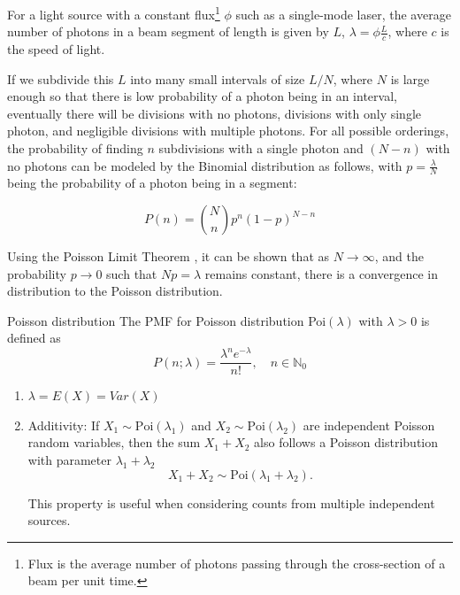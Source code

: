 For a light source with a constant flux\footnote{Flux is the average number of photons passing through the cross-section of a beam per unit time.} $\phi$ such as a single-mode laser, the average number of photons in a beam segment of length is given by $L$, $\lambda = \phi \frac{L}{c}$, where $c$ is the speed of light.

If we subdivide this $L$ into many small intervals  of size $L/N$, where $N$ is large enough so that there is low probability of a photon being in an interval, eventually there will be divisions with no photons, divisions with only single photon, and negligible divisions with multiple photons. For all possible orderings, the probability of finding $n$ subdivisions with a single photon and $(N-n)$ with no photons can be modeled by the Binomial distribution as follows, with $p=\frac{\lambda}{N}$ being the probability of a photon being in a segment:

\begin{equation}
    P(n) = \binom{N}{n} p^n (1 - p)^{N - n}
\end{equation}

Using the Poisson Limit Theorem \cite{fellerIntroductionProbabilityTheory1968}, it can be shown that as $N \to \infty$, and the probability $p \to 0$ such that $Np = \lambda$ remains constant, there is a convergence in distribution to the Poisson distribution.

\begin{note}
    {Poisson distribution}
    The \gls{PMF} for Poisson distribution Poi\((\lambda)\) with \(\lambda > 0\) is defined as
    \begin{equation}
        P(n;\lambda) = \frac{\lambda^n e^{-\lambda}}{n!}, \quad n \in \mathbb{N}_0
    \end{equation}
    \begin{enumerate}
        \item $\lambda = E(X) = Var(X)$ 
        \item Additivity: If $X_1 \sim \text{Poi}(\lambda_1)$ and $X_2 \sim \text{Poi}(\lambda_2)$ are independent Poisson random variables, then the sum $X_1 + X_2$ also follows a Poisson distribution with parameter $\lambda_1 + \lambda_2$
        \begin{equation}
            X_1 + X_2 \sim \text{Poi}(\lambda_1 + \lambda_2).
        \end{equation}
        
        This property is useful when considering counts from multiple independent sources.
    \end{enumerate}
\end{note}

